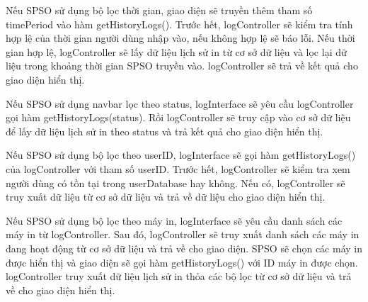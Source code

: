 Nếu SPSO sử dụng bộ lọc thời gian, giao diện sẽ truyền thêm tham số timePeriod vào hàm getHistoryLogs(). Trước hết, logController sẽ kiểm tra tính hợp lệ của thời gian người dùng nhập vào, nếu không hợp lệ sẽ báo lỗi. Nếu thời gian hợp lệ, logController sẽ lấy dữ liệu lịch sử in từ cơ sở dữ liệu và lọc lại dữ liệu trong khoảng thời gian SPSO truyền vào. logController sẽ trả về kết quả cho giao diện hiển thị. \par

Nếu SPSO sử dụng navbar lọc theo status, logInterface sẽ yêu cầu logController gọi hàm getHistoryLogs(status). Rồi logController sẽ truy cập vào cơ sở dữ liệu để lấy dữ liệu lịch sử in theo status và trả kết quả cho giao diện hiển thị.\par

Nếu SPSO sử dụng bộ lọc theo userID, logInterface sẽ gọi hàm getHistoryLogs() của logController với tham số userID. Trước hết, logController sẽ kiểm tra xem người dùng có tồn tại trong userDatabase hay không. Nếu có, logController sẽ truy xuất dữ liệu từ cơ sở dữ liệu và trả về dữ liệu cho giao diện hiển thị. \par

Nếu SPSO sử dụng bộ lọc theo máy in, logInterface sẽ yêu cầu danh sách các máy in từ logController. Sau đó, logController sẽ truy xuất danh sách các máy in đang hoạt động từ cơ sở dữ liệu và trả về cho giao diện. SPSO sẽ chọn các máy in được hiển thị và giao diện sẽ gọi hàm getHistoryLogs() với ID máy in được chọn. logController truy xuất dữ liệu lịch sử in thỏa các bộ lọc từ cơ sở dữ liệu và trả về cho giao diện hiển thị.\par